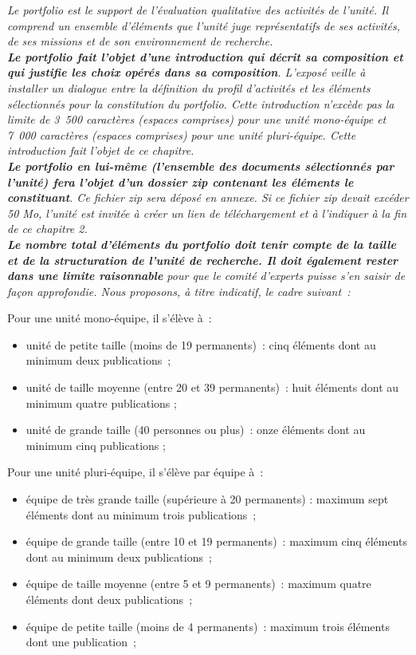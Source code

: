 \documentclass[]{article}
\newcommand{\instructions}[1]{{\em \color{hceresgreen}#1}}
\begin{document}
\instructions{Le portfolio est le support de l’évaluation qualitative des activités de l’unité. Il comprend un ensemble d’éléments que l’unité juge représentatifs de ses activités, de ses missions et de son environnement de recherche.\\

{\bf Le portfolio fait l’objet d’une introduction qui décrit sa composition et qui justifie les choix opérés dans sa composition}. L’exposé veille à installer un dialogue entre la définition du profil d’activités et les éléments sélectionnés pour la constitution du portfolio. Cette introduction n’excède pas la limite de 3 500 caractères (espaces comprises) pour une unité mono-équipe et 7 000 caractères (espaces comprises) pour une unité pluri-équipe. Cette introduction fait l’objet de ce chapitre.\\

{\bf Le portfolio en lui-même (l’ensemble des documents sélectionnés par l’unité) fera l’objet d’un dossier zip contenant les éléments le constituant}. Ce fichier zip sera déposé en annexe. Si ce fichier zip devait excéder 50 Mo, l’unité est invitée à créer un lien de téléchargement et à l’indiquer à la fin de ce chapitre 2.\\

{\bf Le nombre total d’éléments du portfolio doit tenir compte de la taille et de la structuration de l’unité de recherche. Il doit également rester dans une limite raisonnable} pour que le comité d’experts puisse s’en saisir de façon approfondie. Nous proposons, à titre indicatif, le cadre suivant :

Pour une unité mono-équipe, il s’élève à :
\begin{itemize}
\item unité de petite taille (moins de 19 permanents) : cinq éléments dont au minimum deux publications ;
\item unité de taille moyenne (entre 20 et 39 permanents) : huit éléments dont au minimum quatre publications ;
\item unité de grande taille (40 personnes ou plus) : onze éléments dont au minimum cinq publications ;
\end{itemize}

Pour une unité pluri-équipe, il s’élève par équipe à :
\begin{itemize}
\item équipe de très grande taille (supérieure à 20 permanents) : maximum sept éléments dont au minimum trois publications ;
\item équipe de grande taille (entre 10 et 19 permanents) : maximum cinq éléments dont au minimum deux publications ;
\item équipe de taille moyenne (entre 5 et 9 permanents) : maximum quatre éléments dont deux publications ;
\item équipe de petite taille (moins de 4 permanents) : maximum trois éléments dont une publication ;
\end{itemize}

}
\end{document}

